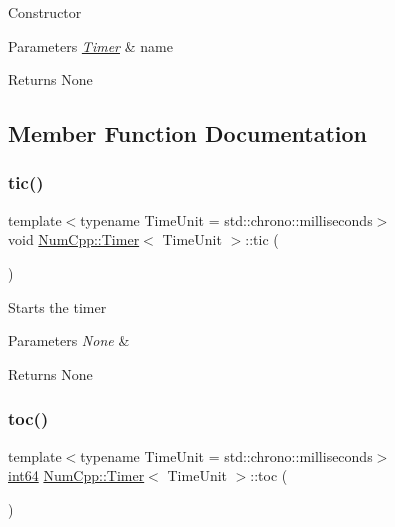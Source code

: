 Constructor


\begin{DoxyParams}{Parameters}
{\em \mbox{\hyperlink{class_num_cpp_1_1_timer}{Timer}}} & name\\
\hline
\end{DoxyParams}
\begin{DoxyReturn}{Returns}
None 
\end{DoxyReturn}


\subsection{Member Function Documentation}
\mbox{\label{class_num_cpp_1_1_timer_a03288816968f855e4e755f35f1f82f85}} 
\subsubsection{\texorpdfstring{tic()}{tic()}}
{\footnotesize\ttfamily template$<$typename Time\+Unit  = std\+::chrono\+::milliseconds$>$ \\
void \mbox{\hyperlink{class_num_cpp_1_1_timer}{Num\+Cpp\+::\+Timer}}$<$ Time\+Unit $>$\+::tic (\begin{DoxyParamCaption}{ }\end{DoxyParamCaption})\hspace{0.3cm}{\ttfamily [inline]}}

Starts the timer


\begin{DoxyParams}{Parameters}
{\em None} & \\
\hline
\end{DoxyParams}
\begin{DoxyReturn}{Returns}
None 
\end{DoxyReturn}
\mbox{\label{class_num_cpp_1_1_timer_a73fdacd0e0dde0812d9c2dac05b7f051}} 
\subsubsection{\texorpdfstring{toc()}{toc()}}
{\footnotesize\ttfamily template$<$typename Time\+Unit  = std\+::chrono\+::milliseconds$>$ \\
\mbox{\hyperlink{namespace_num_cpp_a22e530c7304044b86c04203429f3dcd1}{int64}} \mbox{\hyperlink{class_num_cpp_1_1_timer}{Num\+Cpp\+::\+Timer}}$<$ Time\+Unit $>$\+::toc (\begin{DoxyParamCaption}{ }\end{DoxyParamCaption})\hspace{0.3cm}{\ttfamily [inline]}}


